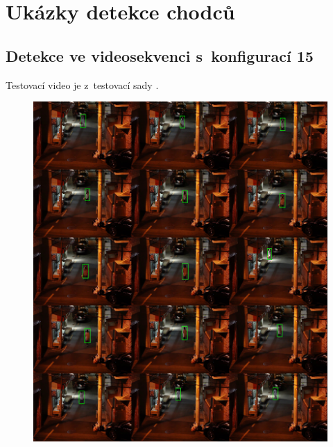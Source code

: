 \section{Ukázky detekce chodců}
\subsection*{Detekce ve videosekvenci s~konfigurací 15}
Testovací video je z~testovací sady \cite{testvideo}.
\begin{figure}[H]
\centering
\includegraphics[keepaspectratio,width=16.5cm]{figures/videoMosaic}
\label{appVideo}
\end{figure}
\newpage
